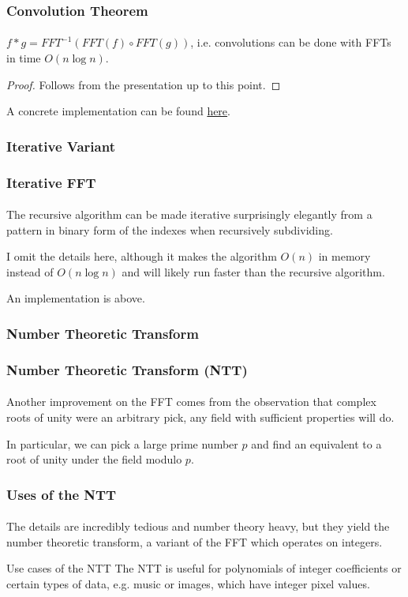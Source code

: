 \documentclass{beamer}                             %
\begin{document}
\begin{frame}
\frametitle{Convolution Theorem}
\framesubtitle{}
\begin{theorem}
  \( f * g = FFT^{-1}(FFT(f) \circ FFT(g)) \), i.e. convolutions 
  can be done with FFTs in time \( O(n \log n) \).
\end{theorem}
\begin{proof}
Follows from the presentation up to this point.
\end{proof}

A concrete implementation can be found 
\href{https://gist.github.com/stephen-huan/aa609965c86d750736398c28b025f9be\#fast-fourier-transform}{here}.
\end{frame}

\subsubsection[Iterative]{Iterative Variant}
\begin{frame}
\frametitle{Iterative FFT}
\framesubtitle{}
The recursive algorithm can be made iterative surprisingly elegantly from a
pattern in binary form of the indexes when recursively subdividing. \pause

I omit the details here, although it makes the algorithm \( O(n) \) in memory
instead of \( O(n \log n) \) and will likely
run faster than the recursive algorithm. \pause

An implementation is above.
\end{frame}

\subsubsection[NTT]{Number Theoretic Transform}
\begin{frame}
\frametitle{Number Theoretic Transform (NTT)}
\framesubtitle{}
Another improvement on the FFT comes from the observation that complex
roots of unity were an arbitrary pick, any \alert{field} with sufficient
properties will do. \pause 

In particular, we can pick a large prime number \( p \) 
and find an equivalent to a root of unity under the field modulo \( p \).
\end{frame}

\begin{frame}
\frametitle{Uses of the NTT}
\framesubtitle{}
The details are incredibly tedious and number theory heavy, but they yield
the \alert{number theoretic transform}, a variant of the FFT which operates
on integers.
\begin{exampleblock}{Use cases of the NTT}
    The NTT is useful for polynomials of integer coefficients or certain types
    of data, e.g. music or images, which have integer pixel values.
\end{exampleblock}
\end{frame}
\end{document}

